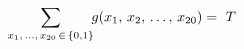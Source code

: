 \documentclass[preview]{standalone}
\begin{document}
\begin{align*}
\special{dvisvgm:raw <g id='unique000'>}\sum_{x_1,\,\ldots,\,x_{20}\,\in\,\{0,1\}}\!\! g(x_1,\,x_2,\,\ldots,\,x_{20})=\  \special{dvisvgm:raw </g>}\special{dvisvgm:raw <g id='unique001'>}T\special{dvisvgm:raw </g>}
\end{align*}
\end{document}
